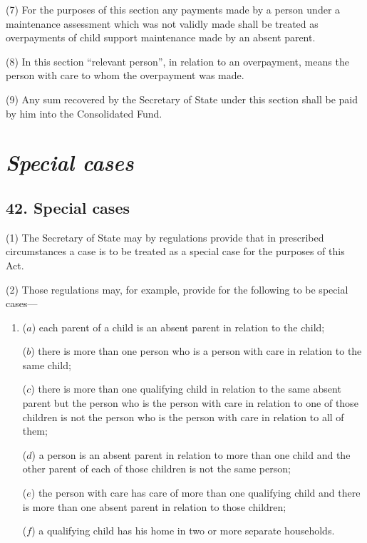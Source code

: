 \documentclass[12pt,a4paper]{article}
\begin{document}
(7) For the purposes of this section any payments made by a person under a maintenance assessment which was not validly made shall be treated as overpayments of child support maintenance made by an absent parent.

(8) In this section “relevant person”, in relation to an overpayment, means the person with care to whom the overpayment was made.

(9) Any sum recovered by the Secretary of State under this section shall be paid by him into the Consolidated Fund.


\section{\itshape Special cases}

\subsection{42. Special cases}

(1) The Secretary of State may by regulations provide that in prescribed circumstances a case is to be treated as a special case for the purposes of this Act.

(2) Those regulations may, for example, provide for the following to be special cases—
\begin{enumerate}\item[]
($a$) each parent of a child is an absent parent in relation to the child;

($b$) there is more than one person who is a person with care in relation to the same child;

($c$) there is more than one qualifying child in relation to the same absent parent but the person who is the person with care in relation to one of those children is not the person who is the person with care in relation to all of them;

($d$) a person is an absent parent in relation to more than one child and the other parent of each of those children is not the same person;

($e$) the person with care has care of more than one qualifying child and there is more than one absent parent in relation to those children;

($f$) a qualifying child has his home in two or more separate households.
\end{enumerate}
\end{document}
